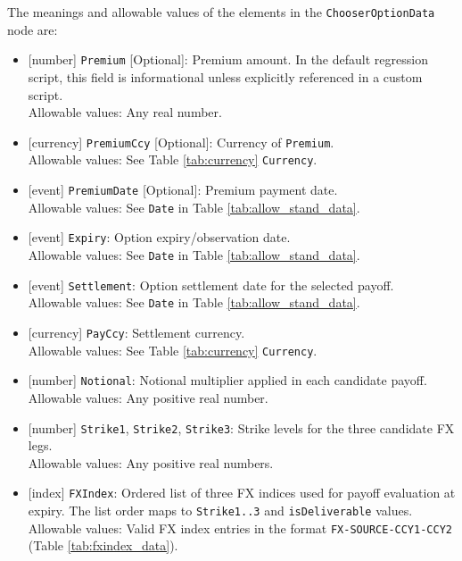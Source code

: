 The meanings and allowable values of the elements in the
\lstinline!ChooserOptionData! node are:

\begin{itemize}
	\item{}[number] \lstinline!Premium! [Optional]: Premium amount. In the default regression script,
		this field is informational unless explicitly referenced in a custom script. \\
		Allowable values: Any real number.

	\item{}[currency] \lstinline!PremiumCcy! [Optional]: Currency of \lstinline!Premium!. \\
		Allowable values: See Table \ref{tab:currency} \lstinline!Currency!.

	\item{}[event] \lstinline!PremiumDate! [Optional]: Premium payment date. \\
		Allowable values: See \lstinline!Date! in Table \ref{tab:allow_stand_data}.

	\item{}[event] \lstinline!Expiry!: Option expiry/observation date. \\
		Allowable values: See \lstinline!Date! in Table \ref{tab:allow_stand_data}.

	\item{}[event] \lstinline!Settlement!: Option settlement date for the selected payoff. \\
		Allowable values: See \lstinline!Date! in Table \ref{tab:allow_stand_data}.

	\item{}[currency] \lstinline!PayCcy!: Settlement currency. \\
		Allowable values: See Table \ref{tab:currency} \lstinline!Currency!.

	\item{}[number] \lstinline!Notional!: Notional multiplier applied in each candidate payoff. \\
		Allowable values: Any positive real number.

	\item{}[number] \lstinline!Strike1!, \lstinline!Strike2!, \lstinline!Strike3!: Strike levels for
		the three candidate FX legs. \\
		Allowable values: Any positive real numbers.

	\item{}[index] \lstinline!FXIndex!: Ordered list of three FX indices used for payoff evaluation at
		expiry. The list order maps to \lstinline!Strike1..3! and \lstinline!isDeliverable! values. \\
		Allowable values: Valid FX index entries in the format
		\lstinline!FX-SOURCE-CCY1-CCY2! (Table \ref{tab:fxindex_data}).


\end{itemize}
